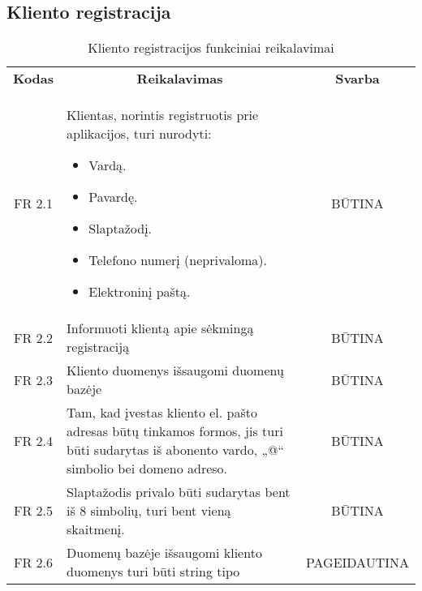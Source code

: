 \documentclass{VUMIFPSkursinis}
\begin{document}
\subsection{Kliento registracija}
\begin{center}

	\begin{table}[H]
	\begin{tabular}{|p{2cm}|p{}|p{}|}
	\hline
	    \rowcolor{lightgray}
		\multicolumn{3}{|c|}{Kliento registracija}\\
		
	\hline
		\multicolumn{1}{|c|}{{\bfseries Kodas}}&
		\multicolumn{1}{|c|}{{\bfseries Reikalavimas}}&
		\multicolumn{1}{|c|}{{\bfseries Svarba}}\\

	\hline
	\multicolumn{1}{|c|}{FR 2.1}&
	{Klientas, norintis registruotis prie aplikacijos, turi nurodyti:
		\begin{itemize}
			\item Vardą.
			\item Pavardę.
			\item Slaptažodį.
			\item Telefono numerį (neprivaloma).
			\item Elektroninį paštą.
		\end{itemize}}&		
	\multicolumn{1}{|c|}{BŪTINA}\\
	\hline
	
		\multicolumn{1}{|c|}{FR 2.2}&
		{Informuoti klientą apie sėkmingą registraciją}&
		\multicolumn{1}{|c|}{BŪTINA}\\	
	\hline
		\multicolumn{1}{|c|}{FR 2.3}&
		{Kliento duomenys išsaugomi duomenų bazėje}&
		\multicolumn{1}{|c|}{BŪTINA}\\	
	\hline	
		\multicolumn{1}{|c|}{FR 2.4}&
		{Tam, kad įvestas kliento el. pašto adresas būtų tinkamos formos, jis turi būti sudarytas iš abonento vardo, „@“ simbolio bei domeno adreso.}&
		\multicolumn{1}{|c|}{BŪTINA}\\	
	\hline
		\multicolumn{1}{|c|}{FR 2.5}&
		{Slaptažodis privalo būti sudarytas bent iš 8 simbolių, turi bent vieną skaitmenį.
}&
		\multicolumn{1}{|c|}{BŪTINA}\\		
	\hline
		\multicolumn{1}{|c|}{FR 2.6}&
		{Duomenų bazėje išsaugomi kliento duomenys turi būti string tipo }&
		\multicolumn{1}{|p{1.5cm}|}{PAGEIDAUTINA}\\		
	\hline
	
	\end{tabular}
	\caption{Kliento registracijos funkciniai reikalavimai}
	\label{table:VartotojoRegistracija}
	\end{table}

\end{center}
\end{document}
